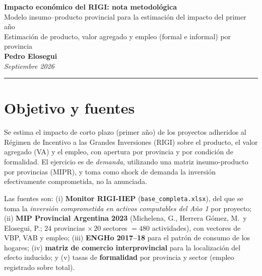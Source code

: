 \documentclass[11pt]{article}
\begin{document}
\begin{center}
{\Large\bfseries\color{navy} Impacto económico del RIGI: nota metodológica}\\[2pt]
{\large Modelo insumo--producto provincial para la estimación del impacto del primer año}\\[4pt]
{\small Estimación de producto, valor agregado y empleo (formal e informal) por provincia}\\[2pt]
{\normalsize\bfseries Pedro Elosegui}\\[2pt]
{\small\itshape Septiembre 2026}
\end{center}
\vspace{-4pt}
\hrule
\vspace{6pt}

\section{Objetivo y fuentes}
Se estima el impacto de corto plazo (primer año) de los proyectos adheridos al Régimen de Incentivo a las Grandes Inversiones (RIGI) sobre el producto, el valor agregado (VA) y el empleo, con apertura por provincia y por condición de formalidad. El ejercicio es de \emph{demanda}, utilizando una matriz insumo-producto por provincias (MIPR), y toma como shock de demanda la inversión efectivamente comprometida, no la anunciada.

Las fuentes son: (i) \textbf{Monitor RIGI-IIEP} (\texttt{base\_completa.xlsx}), del que se toma la \emph{inversión comprometida en activos computables del Año 1} por proyecto; (ii) \textbf{MIP Provincial Argentina 2023} (Michelena, G., Herrera Gómez, M.\ y Elosegui, P.; $24$ provincias $\times\,20$ sectores $=480$ actividades), con vectores de VBP, VAB y empleo; (iii) \textbf{ENGHo 2017--18} para el patrón de consumo de los hogares; (iv) \textbf{matriz de comercio interprovincial} para la localización del efecto inducido; y (v) tasas de \textbf{formalidad} por provincia y sector (empleo registrado sobre total).
\end{document}
